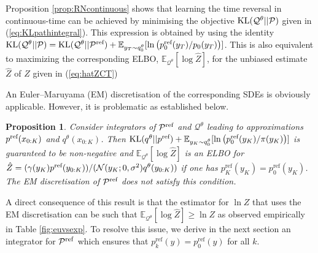 \documentclass{article} %
\newtheorem{proposition}{Proposition}
\begin{document}
Proposition \ref{prop:RNcontinuous} shows that learning the time reversal in continuous-time can be achieved by minimising the objective $\mathrm{KL}(\mathcal{Q}^\theta||\mathcal{P})$ given in (\ref{eq:KLpathintegral}). This expression is obtained by using the identity $\mathrm{KL}(\mathcal{Q}^\theta||\mathcal{P})=\mathrm{KL}(\mathcal{Q}^\theta||\mathcal{P}^{\textup{ref}})+\mathbb{E}_{y_T \sim q^{\theta}_0}[\ln \left(p^{\textup{ref}}_0(y_T)/p_0(y_T)\right)]$. This is also equivalent to maximizing the corresponding ELBO, $\mathbb{E}_{\mathcal{Q}^\theta}[\log \hat{Z}]$, for the unbiased estimate $\hat{Z}$ of $Z$ given in (\ref{eq:hatZCT})

An Euler--Maruyama (EM) discretisation of the corresponding SDEs is obviously applicable. However, it is problematic as established below.
\begin{proposition}\label{prop:notelbo}
Consider integrators of $\mathcal{P}^{\textup{ref}}$ and $\mathcal{Q}^{\theta}$ leading to approximations $p^{\textup{ref}}(x_{0:K})$ and $q^{\theta}(x_{0:K})$. Then $\mathrm{KL}(q^\theta||{p}^{\textup{ref}})+\mathbb{E}_{y_K \sim q^{\theta}_0}[\ln \left(p^{\textup{ref}}_0(y_K)/\pi(y_K)\right)]$ is guaranteed to be non-negative and $\mathbb{E}_{\mathcal{Q}^\theta}[\log \hat{Z}]$ is an ELBO for $\hat{Z}=(\gamma(y_{K})p^{\textup{ref}}(y_{0:K}))/(\mathcal{N}(y_K;0,\sigma^2) q^\theta(y_{0:K}))$ if one has $p^{\mathrm{ref}}_K(y_K) = p_0^{\mathrm{ref}}(y_K)$. The EM discretisation of $\mathcal{P}^{\textup{ref}}$ does \emph{not} satisfy this condition.
\end{proposition}

A direct consequence of this result is that the estimator for $\ln Z$ that uses the EM discretisation can be such that $\mathbb{E}_{\mathcal{Q}^\theta}[\log \hat{Z}] \geq \ln Z$ as observed empirically in Table \ref{fig:euvsexp}. To resolve this issue, we  derive in the next section an integrator for ${\mathcal{P}}^{\mathrm{ref}}$ which ensures that $p^{\mathrm{ref}}_k(y) = p_0^{\mathrm{ref}}(y)$ for all $k$. 
\end{document}
